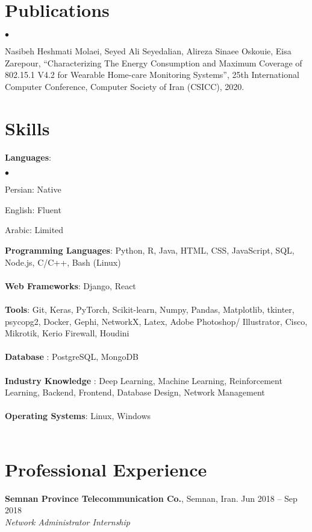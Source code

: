 \documentclass[margin,line]{res}
\newenvironment{list2}{
  \begin{list}{$\bullet$}{%
      \setlength{\itemsep}{0in}
      \setlength{\parsep}{0in} \setlength{\parskip}{0in}
      \setlength{\topsep}{0in} \setlength{\partopsep}{0in}
      \setlength{\leftmargin}{0.2in}}}{\end{list}}
\begin{document}
\begin{resume}
\section{\sc Publications}
\begin{list2}
	\item Nasibeh Heshmati Molaei, Seyed Ali Seyedalian, Alireza Sinaee Oskouie, Eisa Zarepour, “Characterizing
	The Energy Consumption and Maximum Coverage of 802.15.1 V4.2 for Wearable Home-care Monitoring
	Systems”, 25th International Computer Conference, Computer Society of Iran (CSICC), 2020.
\end{list2}

\section{\sc Skills}
{\bf Languages}:
\begin{list2} 
	\item  Persian: Native 
	\item English: Fluent
	\item Arabic: Limited 
\end{list2}

{\bf Programming  Languages}:  
Python, R, Java, HTML, CSS, JavaScript,  SQL, Node.js, C/C++, Bash (Linux)\\ \\ 
{\bf Web Frameworks}: 
Django, React\\ \\
{\bf Tools}: 
Git, Keras, PyTorch, Scikit-learn, Numpy, Pandas, Matplotlib, tkinter, psycopg2, Docker,  Gephi, NetworkX,  Latex, Adobe Photoshop/ Illustrator, Cisco, Mikrotik, Kerio Firewall, Houdini \\ \\
{\bf Database }: PostgreSQL, MongoDB \\ \\ 
{\bf Industry Knowledge} : Deep Learning, Machine Learning, Reinforcement Learning, Backend, Frontend, Database Design, Network Management\\ \\
{\bf Operating Systems}: 
Linux, Windows\\ \\

\section{\sc Professional Experience}
{\bf Semnan Province Telecommunication Co.}, Semnan, Iran. \hfill{Jun 2018 -- Sep 2018}\\
{\em Network Administrator Internship }\\


\end{resume}
\end{document}
